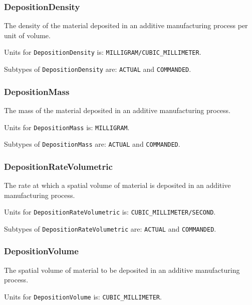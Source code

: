 \subsubsection{DepositionDensity}
  \label{sec:DepositionDensity}



The density of the material deposited in an additive manufacturing process per unit of volume.


Units for \texttt{DepositionDensity} is: \texttt{MILLIGRAM/CUBIC_MILLIMETER}.


Subtypes of \texttt{DepositionDensity} are: \texttt{ACTUAL} and \texttt{COMMANDED}. 
\FloatBarrier

\subsubsection{DepositionMass}
  \label{sec:DepositionMass}



The mass of the material deposited in an additive manufacturing process.


Units for \texttt{DepositionMass} is: \texttt{MILLIGRAM}.


Subtypes of \texttt{DepositionMass} are: \texttt{ACTUAL} and \texttt{COMMANDED}. 
\FloatBarrier

\subsubsection{DepositionRateVolumetric}
  \label{sec:DepositionRateVolumetric}



The rate at which a spatial volume of material is deposited in an additive manufacturing process.


Units for \texttt{DepositionRateVolumetric} is: \texttt{CUBIC_MILLIMETER/SECOND}.


Subtypes of \texttt{DepositionRateVolumetric} are: \texttt{ACTUAL} and \texttt{COMMANDED}. 
\FloatBarrier

\subsubsection{DepositionVolume}
  \label{sec:DepositionVolume}



The spatial volume of material to be deposited in an additive manufacturing process.


Units for \texttt{DepositionVolume} is: \texttt{CUBIC_MILLIMETER}.


